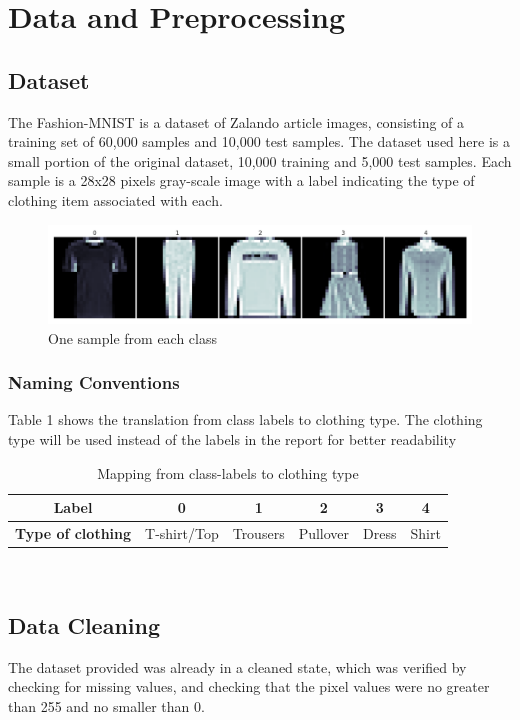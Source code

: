 \section{Data and Preprocessing}
\subsection{Dataset}
The Fashion-MNIST is a dataset of Zalando article images, consisting of a training set of 60,000 samples and 10,000 test samples.
The dataset used here is a small portion of the original dataset, 10,000 training and 5,000 test samples.
Each sample is a 28x28 pixels gray-scale image with a label indicating the type of clothing item associated with each.
\newline

\begin{figure}[ht]
\centering
\includegraphics[scale=0.45]{figures_for_report/samples_from_classes}
\captionsetup{justification=centering,margin=2cm}
\caption{One sample from each class}
\end{figure}
\subsubsection{Naming Conventions}
Table 1 shows the translation from class labels to clothing type.
The clothing type will be used instead of the labels in the report for better readability \\
\begin{table}[!ht]
  \footnotesize
  \centering
\begin{tabular}{ c c c c c c }
 \toprule
 \textbf{Label} & 0 & 1 & 2 & 3 & 4 \\
 \midrule 
 \textbf{Type of clothing} & T-shirt/Top & Trousers & Pullover & Dress & Shirt \\
 \bottomrule
\end{tabular} \\[0.2cm]
\captionsetup{justification=centering,margin=2cm}
\caption{Mapping from class-labels to clothing type}
\label{tab:features}
\end{table}


\subsection{Data Cleaning}\label{subsec:data-cleaning}
The dataset provided was already in a cleaned state, which was verified by checking for missing values,
and checking that the pixel values were no greater than 255 and no smaller than 0.

